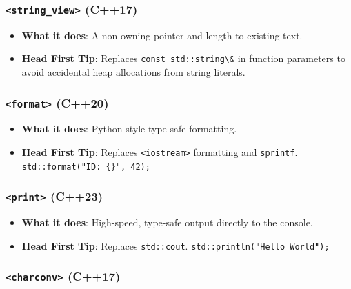 \hypertarget{string_view-c17}{%
\subsubsection{\texorpdfstring{\texttt{\textless{}string\_view\textgreater{}}
(C++17)}{\textless string\_view\textgreater{} (C++17)}}\label{string_view-c17}}

\begin{itemize}
\tightlist
\item
  \textbf{What it does}: A non-owning pointer and length to existing
  text.
\item
  \textbf{Head First Tip}: Replaces
  \passthrough{\lstinline!const std::string\&!} in function parameters
  to avoid accidental heap allocations from string literals.
\end{itemize}

\hypertarget{format-c20}{%
\subsubsection{\texorpdfstring{\texttt{\textless{}format\textgreater{}}
(C++20)}{\textless format\textgreater{} (C++20)}}\label{format-c20}}

\begin{itemize}
\tightlist
\item
  \textbf{What it does}: Python-style type-safe formatting.
\item
  \textbf{Head First Tip}: Replaces \passthrough{\lstinline!<iostream>!}
  formatting and \passthrough{\lstinline!sprintf!}.
  \passthrough{\lstinline!std::format("ID: \{\}", 42);!}
\end{itemize}

\hypertarget{print-c23}{%
\subsubsection{\texorpdfstring{\texttt{\textless{}print\textgreater{}}
(C++23)}{\textless print\textgreater{} (C++23)}}\label{print-c23}}

\begin{itemize}
\tightlist
\item
  \textbf{What it does}: High-speed, type-safe output directly to the
  console.
\item
  \textbf{Head First Tip}: Replaces \passthrough{\lstinline!std::cout!}.
  \passthrough{\lstinline!std::println("Hello World");!}
\end{itemize}

\hypertarget{charconv-c17}{%
\subsubsection{\texorpdfstring{\texttt{\textless{}charconv\textgreater{}}
(C++17)}{\textless charconv\textgreater{} (C++17)}}\label{charconv-c17}}

